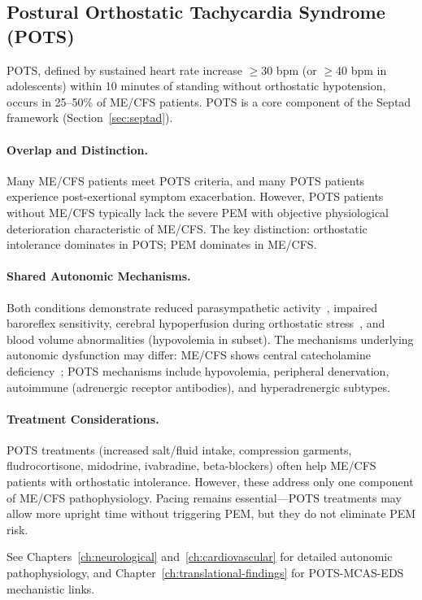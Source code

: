 \subsection{Postural Orthostatic Tachycardia Syndrome (POTS)}

POTS, defined by sustained heart rate increase $\geq$30 bpm (or $\geq$40 bpm in adolescents) within 10 minutes of standing without orthostatic hypotension, occurs in 25--50\% of ME/CFS patients. POTS is a core component of the Septad framework (Section~\ref{sec:septad}).

\paragraph{Overlap and Distinction.}
Many ME/CFS patients meet POTS criteria, and many POTS patients experience post-exertional symptom exacerbation. However, POTS patients without ME/CFS typically lack the severe PEM with objective physiological deterioration characteristic of ME/CFS. The key distinction: orthostatic intolerance dominates in POTS; PEM dominates in ME/CFS.

\paragraph{Shared Autonomic Mechanisms.}
Both conditions demonstrate reduced parasympathetic activity~\cite{walitt2024deep}, impaired baroreflex sensitivity, cerebral hypoperfusion during orthostatic stress~\cite{VanCampenEtAl2020}, and blood volume abnormalities (hypovolemia in subset). The mechanisms underlying autonomic dysfunction may differ: ME/CFS shows central catecholamine deficiency~\cite{walitt2024deep}; POTS mechanisms include hypovolemia, peripheral denervation, autoimmune (adrenergic receptor antibodies), and hyperadrenergic subtypes.

\paragraph{Treatment Considerations.}
POTS treatments (increased salt/fluid intake, compression garments, fludrocortisone, midodrine, ivabradine, beta-blockers) often help ME/CFS patients with orthostatic intolerance. However, these address only one component of ME/CFS pathophysiology. Pacing remains essential---POTS treatments may allow more upright time without triggering PEM, but they do not eliminate PEM risk.

See Chapters~\ref{ch:neurological} and~\ref{ch:cardiovascular} for detailed autonomic pathophysiology, and Chapter~\ref{ch:translational-findings} for POTS-MCAS-EDS mechanistic links.

